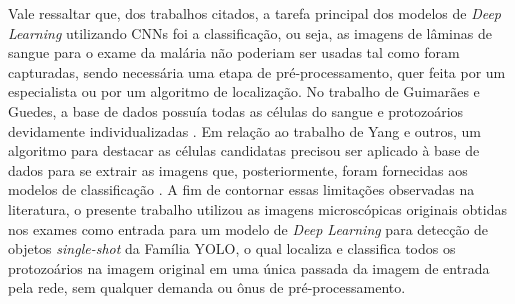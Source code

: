 Vale ressaltar que, dos trabalhos citados, a tarefa principal dos modelos de \emph{Deep Learning} utilizando CNNs foi a classificação, ou seja, as imagens de lâminas de sangue para o exame da malária não poderiam ser usadas tal como foram capturadas, sendo necessária uma etapa de pré-processamento, quer feita por um especialista ou por um algoritmo de localização. No trabalho de Guimarães e Guedes, a base de dados possuía todas as células do sangue e protozoários devidamente individualizadas \cite{Felipe:2022}. Em relação ao trabalho de Yang e outros, um algoritmo para destacar as células candidatas precisou ser aplicado à base de dados para se extrair as imagens que, posteriormente, foram fornecidas aos modelos de classificação \cite{Yang:2020}. A fim de contornar essas limitações observadas na literatura, o presente trabalho utilizou as imagens microscópicas originais obtidas nos exames como entrada para um modelo de \emph{Deep Learning} para detecção de objetos \emph{single-shot} da Família YOLO, o qual localiza e classifica todos os  protozoários na imagem original em uma única passada da imagem de entrada pela rede, sem qualquer demanda ou ônus de pré-processamento.